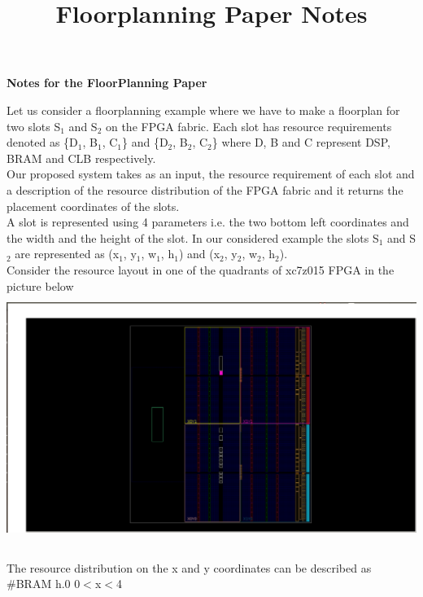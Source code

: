 \documentclass[11pt]{article}
\theoremstyle{definition}
\begin{document}
\setcounter{section}{8}
\title{Floorplanning Paper Notes}

\thispagestyle{empty}

\begin{center}
{\LARGE \bf Notes for the FloorPlanning Paper}\\
\end{center}

Let us consider a floorplanning example where we have to make a floorplan for two slots S$_1$ and S$_2$ on the FPGA fabric. Each slot has resource requirements denoted as \{D$_1$, B$_1$, C$_1$\} and \{D$_2$, B$_2$, C$_2$\} where D, B and C represent DSP, BRAM and CLB respectively. \\ Our proposed system takes as an input, the resource requirement of each slot and a description of the resource distribution of the FPGA fabric and it returns the placement coordinates of the slots. \\
A slot is represented using 4 parameters i.e. the two bottom left coordinates and the width and the height of the slot. In our considered example the slots S$_1$ and S$_2$ are represented as (x$_1$, y$_1$, w$_1$, h$_1$) and (x$_2$, y$_2$, w$_2$, h$_2$). \\

Consider the resource layout in one of the quadrants of xc7z015 FPGA in the picture below
\includegraphics[width=\textwidth, height=8cm]{graphics/fpga_1.png} \\ \\

The resource distribution on the x and y coordinates can be described as \\

\hspace{15mm} \#BRAM \hspace{15mm} h.0 \hspace{10mm}  0$<$x$<$4 
   
\end{document}
